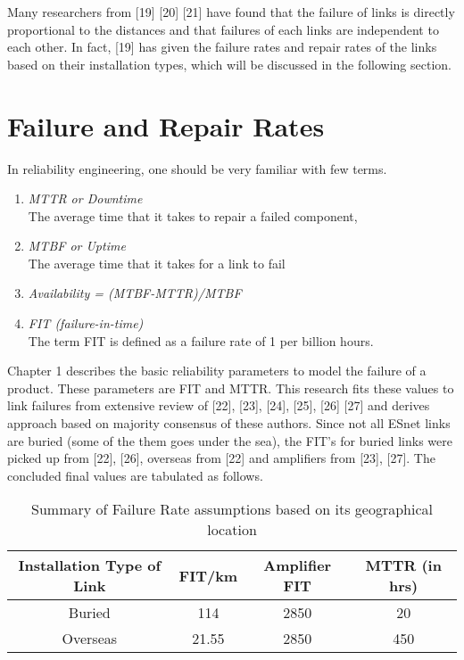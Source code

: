 	 Many researchers from [19] [20] [21] have found that the failure of links is directly proportional to the distances and that failures of each links are independent to each other. In fact, [19] has given the failure rates and repair rates of the links based on their installation types, which will be discussed in the following section. 
	
\section{Failure and Repair Rates}	

In reliability engineering, one should be very familiar with few terms.		

\begin{enumerate}[label=(\alph*),leftmargin=*]
\item\textit{MTTR or Downtime}\\
	The average time that it takes to repair a failed component,
\item\textit{MTBF or Uptime}\\
	The average time that it takes for a link to fail
\item\textit{Availability = (MTBF-MTTR)/MTBF}
\item\textit{FIT (failure-in-time)}\\
The term FIT is defined as a failure rate of 1 per billion hours.
\end{enumerate}

Chapter 1 describes the basic reliability parameters to model the failure of a product. These parameters are FIT and MTTR. This research fits these values to link failures from extensive review of  [22], [23], [24], [25], [26] [27] and derives approach based on majority consensus of these authors. Since not all ESnet links are buried (some of the them goes under the sea), the FIT's for buried links were picked up from [22], [26], overseas from [22] and amplifiers from [23], [27]. The concluded final values are tabulated as follows.

\begin{table}[!htbp]
\centering
\caption{Summary of Failure Rate assumptions based on its geographical location}
 	\begin{tabular}{|c|c|c|c|}
	\hline\hline
	\textbf{Installation Type of Link} & \textbf{FIT/km} & \textbf{Amplifier FIT} & \textbf{MTTR (in hrs)}\\
	\hline
	Buried&114&2850&20\\
	Overseas&21.55&2850&450\\
	\hline
	\end{tabular}
\end{table}

